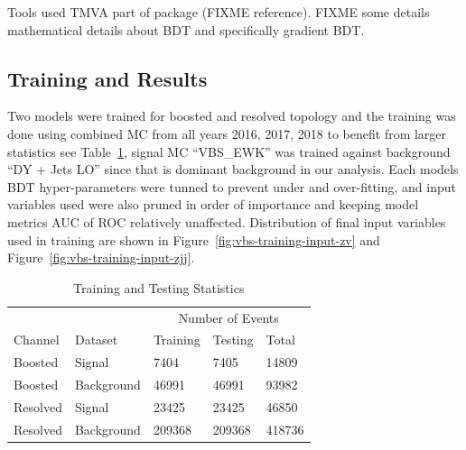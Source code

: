 Tools used \gls{TMVA} part of \ROOT{} package (FIXME reference). FIXME some details mathematical
details about BDT and specifically gradient BDT\@.

\subsection{
  Training and Results
}

Two models were trained for boosted and resolved topology and
the training was done using combined MC from all years 2016, 2017, 2018
to benefit from larger statistics see Table~\ref{tab:training-stats},
signal MC ``VBS\_EWK'' was trained against background ``DY + Jets LO'' since
that is dominant background in our analysis.
Each models \gls{BDT} hyper-parameters were tunned to prevent under and over-fitting,
and input variables used were also pruned in order of importance and keeping
model metrics \gls{AUC} of \gls{ROC} relatively unaffected. Distribution of final input variables
used in training are shown in Figure~\ref{fig:vbs-training-input-zv} and Figure~\ref{fig:vbs-training-input-zjj}.

\begin{table}[!ht]
  \centering
  \caption{Training and Testing Statistics}
  \begin{tabular}{lllll}%
    \toprule
             &            & \multicolumn{3}{c}{Number of Events}                    \\
    \cmidrule(lr){3-5}
    Channel  & Dataset    & Training                             & Testing & Total  \\
    \midrule
    Boosted  & Signal     & 7404                                 & 7405    & 14809  \\
    Boosted  & Background & 46991                                & 46991   & 93982  \\
    \midrule
    Resolved & Signal     & 23425                                & 23425   & 46850  \\
    Resolved & Background & 209368                               & 209368  & 418736 \\
    \bottomrule
  \end{tabular}\label{tab:training-stats}
\end{table}

